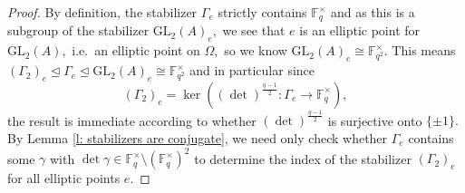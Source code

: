 \documentclass[11pt]{amsart}
\newtheorem{corollary}[theorem]{Corollary}
\theoremstyle{definition}
\numberwithin{equation}{section}
\newcommand{\GL}{\mathrm{GL}} 	%
\newcommand{\bbF}{\mathbb{F}}		%
\begin{document}
		\begin{proof}
			By definition, the stabilizer $\Gamma_e$ strictly contains $\bbF_q^{\times}$ and as this is a subgroup of the stabilizer $\GL_2(A)_e,$ we see that $e$ is an elliptic point for $\GL_2(A),$ i.e.\ an elliptic point on $\Omega,$ so we know $\GL_2(A)_e\cong \bbF_{q^2}^{\times}.$ This means $(\Gamma_2)_e\unlhd \Gamma_e\unlhd \GL_2(A)_e\cong \bbF_{q^2}^{\times}$ and in particular since 
			\[(\Gamma_2)_e=\ker((\det)^{\frac{q-1}{2}}:\Gamma_e\to \bbF_q^{\times}),\] the result is immediate according to whether $\displaystyle{(\det)^{\frac{q-1}{2}}}$ is surjective onto $\{\pm 1\}.$ By Lemma \ref{l: stabilizers are conjugate}, we need only check whether $\Gamma_e$ contains some $\gamma$ with $\det\gamma\in \bbF_q^{\times}\setminus (\bbF_q^{\times})^2$ to determine the index of the stabilizer $(\Gamma_2)_e$ for all elliptic points $e.$
		\end{proof}
		
\end{document}
